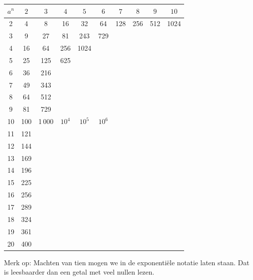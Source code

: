\documentclass[12pt,twoside,a4paper]{article}
\begin{document}
\begin{adjustwidth}{-0.3cm}{0.3cm}
\begin{center}
\begin{tabular}{|c|c|c|c|c|c|c|c|c|c|}
  \hline
  $a^n$ & $2$ & $3$ & $4$ & $5$ & $6$ & $7$ & $8$ & $9$ & $10$\\
  \hline
  2     & 4   & 8   & 16  & 32  & 64  & 128 & 256 & 512 & 1024\\
  \cline{1-10}
  3     & 9   & 27  & 81  & 243 & 729\\
  \cline{1-6}
  4     & 16  & 64  & 256 & 1024\\
  \cline{1-5}
  5     & 25  & 125 & 625\\
  \cline{1-4}
  6     & 36  & 216\\
  \cline{1-3}
  7     & 49  & 343\\
  \cline{1-3}
  8     & 64  & 512\\
  \cline{1-3}
  9     & 81  & 729\\
  \cline{1-6}
  10    & 100  & 1\,000 & $10^4$ & $10^5$ & $10^6$\\
  \cline{1-6}
  11    & 121\\
  \cline{1-2}
  12    & 144\\
  \cline{1-2}
  13    & 169\\
  \cline{1-2}
  14    & 196\\
  \cline{1-2}
  15    & 225\\
  \cline{1-2}
  16    & 256\\
  \cline{1-2}
  17    & 289\\
  \cline{1-2}
  18    & 324\\
  \cline{1-2}
  19    & 361\\
  \cline{1-2}
  20    & 400\\
  \cline{1-2}
\end{tabular}
\end{center}
\end{adjustwidth}

Merk op: Machten van tien mogen we in de exponentiële notatie laten staan. Dat is leesbaarder dan een getal met veel nullen lezen.
\end{document}
